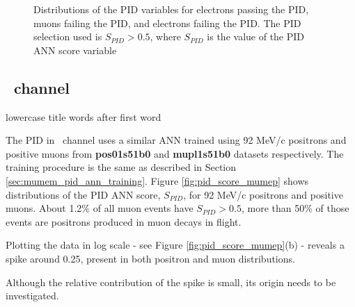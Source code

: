 \begin{figure}[H]
   {
    \label{fig:electrons_failing_pid}
    Distributions of the PID variables for electrons passing the PID, muons failing the PID, and electrons failing the PID.
    The PID selection used is $S_{PID} > 0.5$, where $S_{PID}$ is the value of the PID ANN score variable
  }
\end{figure}


\newpage
\subsection{\MuToEp\ channel}
\label{sec:mumep_channel_pid}
{\blue lowercase title words after first word}

{\blue The} PID in \MuToEp\ channel uses a similar ANN trained  using  92 MeV/c positrons and
{\blue positive muons} from {\bf pos01s51b0} and {\bf mupl1s51b0} datasets {\blue respectively}. 
The training procedure is the same as described in Section \ref{sec:mumem_pid_ann_training}.
% 
Figure \ref{fig:pid_score_mumep} shows distributions of the PID ANN score, $S_{PID}$,
for 92 MeV{\blue /c} positrons and  {\blue positive muons}. About 1.2\% of all muon events have $S_{PID} > 0.5$,
more than 50\% of those events are  {\blue positrons} produced in muon decays in flight.

Plotting the data in log scale - see Figure \ref{fig:pid_score_mumep}(b) - reveals a spike around 0.25,
present in both positron and muon distributions.

{\red Although the relative contribution of the spike is small, its origin needs to be investigated.}

